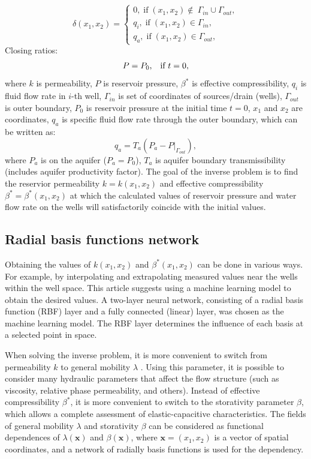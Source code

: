 \documentclass[
11pt,%
tightenlines,%
twoside,%
onecolumn,%
nofloats,%
nobibnotes,%
nofootinbib,%
superscriptaddress,%
noshowpacs,%
centertags]%
{revtex4}
\begin{document}
\begin{equation} \label{bc}
	\delta(x_1,x_2)  = \left\{\begin{array}{crl}
		0, \;\mbox{if}\;(x_1,x_2) \notin\ \Gamma_{in}\cup\Gamma_{out},\\
		q_{i}, \;\mbox{if}\;(x_1,x_2) \in \Gamma_{in},\\
		q_{a}, \;\mbox{if}\;(x_1,x_2) \in \Gamma_{out},
	\end{array}\right. 
\end{equation}
Closing ratios:
\begin{equation} \label{kr}
	P = P_0\mbox{,\quad \mbox{if} $t=0$},
\end{equation}
where $k$ is permeability, $P$ is reservoir pressure, $\beta^*$ is
effective compressibility, $q_i$ is fluid flow rate in $i$-th well, $\Gamma_{in}$
is set of coordinates of sources/drain (wells), $\Gamma_{out}$ is
outer boundary, $P_0$ is reservoir pressure at the initial time $t=0$, $x_1$ and $x_2$ are coordinates, $q_{a}$ is specific fluid flow rate through the outer boundary, which can be written as:
\begin{equation*} \label{qaq}
	q_a = T_{a}(P_{a} - P|_{\Gamma_{out}}),
\end{equation*}
where $P_a$ is on the aquifer ($P_a = P_0$), $T_a$ is
aquifer boundary transmissibility (includes aquifer productivity factor). The goal of the inverse problem is to find the reservior permeability $k = k(x_1,x_2)$ and effective compressibility $\beta^* = \beta^*(x_1,x_2)$ at which the calculated values of reservoir pressure and water flow rate on the wells will satisfactorily coincide with the initial values.

\subsection{Radial basis functions network}

Obtaining the values of $k(x_1,x_2)$ and $\beta^*(x_1,x_2)$ can be done in various ways. For example, by interpolating and extrapolating measured values near the wells within the well space. This article suggests using a machine learning model to obtain the desired values. A two-layer neural network, consisting of a radial basis function (RBF) layer and a fully connected (linear) layer, was chosen as the machine learning model. The RBF layer determines the influence of each basis at a selected point in space.

When solving the inverse problem, it is more convenient to switch from permeability $k$ to general mobility $\lambda$ \cite{abd}. Using this parameter, it is possible to consider many hydraulic parameters that affect the flow structure (such as viscosity, relative phase permeability, and others). Instead of effective compressibility $\beta^*$, it is more convenient to switch to the storativity parameter $\beta$, which allows a complete assessment of elastic-capacitive characteristics. The fields of general mobility $\lambda$ and storativity $\beta$ can be considered as functional dependences of $\lambda(\mathbf{x})$ and $\beta(\mathbf{x})$, where $\mathbf{x} = (x_1,x_2)$ is a vector of spatial coordinates, and a network of radially basis functions is used for the dependency.
\end{document}

